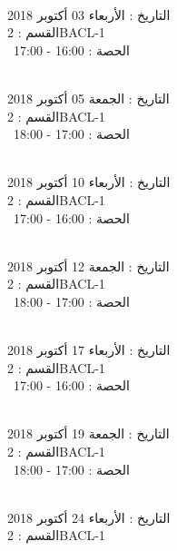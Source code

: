 \documentclass[14pt a4paper twocolumn]{book}
\begin{document}
\noindent\makebox[\linewidth]{\rule{\paperwidth}{0.4pt}}
 \\
التاريخ : الأربعاء 03 أكتوبر 2018 \\
القسم : 2BACL-1 \\
 \  
الحصة : 16:00 - 17:00 \\
\par
\noindent\makebox[\linewidth]{\rule{\paperwidth}{0.4pt}}
 \\
التاريخ : الجمعة 05 أكتوبر 2018 \\
القسم : 2BACL-1 \\
 \  
الحصة : 17:00 - 18:00 \\
\par
\noindent\makebox[\linewidth]{\rule{\paperwidth}{0.4pt}}
 \\
التاريخ : الأربعاء 10 أكتوبر 2018 \\
القسم : 2BACL-1 \\
 \  
الحصة : 16:00 - 17:00 \\
\par
\noindent\makebox[\linewidth]{\rule{\paperwidth}{0.4pt}}
 \\
التاريخ : الجمعة 12 أكتوبر 2018 \\
القسم : 2BACL-1 \\
 \  
الحصة : 17:00 - 18:00 \\
\par
\noindent\makebox[\linewidth]{\rule{\paperwidth}{0.4pt}}
 \\
التاريخ : الأربعاء 17 أكتوبر 2018 \\
القسم : 2BACL-1 \\
 \  
الحصة : 16:00 - 17:00 \\
\par
\noindent\makebox[\linewidth]{\rule{\paperwidth}{0.4pt}}
 \\
التاريخ : الجمعة 19 أكتوبر 2018 \\
القسم : 2BACL-1 \\
 \  
الحصة : 17:00 - 18:00 \\
\par
\noindent\makebox[\linewidth]{\rule{\paperwidth}{0.4pt}}
 \\
التاريخ : الأربعاء 24 أكتوبر 2018 \\
القسم : 2BACL-1 \\
\end{document}
